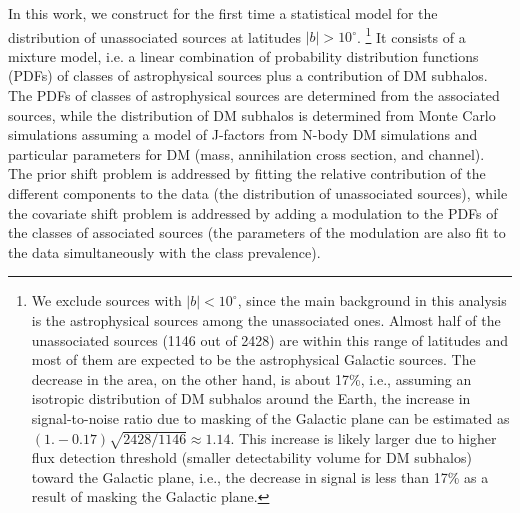 In this work, we construct for the first time a statistical model for the distribution of unassociated sources at latitudes $|b| > 10^\circ$.%
\footnote{We exclude sources with $|b| < 10^\circ$, since the main background in this analysis is the astrophysical sources among the unassociated ones. Almost half of the unassociated sources (1146 out of 2428) are within this range of latitudes and most of them are expected to be the astrophysical Galactic sources. The decrease in the area, on the other hand, is about 17\%, i.e., assuming an isotropic distribution of DM subhalos around the Earth, the increase in signal-to-noise ratio due to masking of the Galactic plane can be estimated as $ (1. - 0.17) \sqrt{2428/1146} \approx 1.14$.
This increase is likely larger due to higher flux detection threshold (smaller detectability volume for DM subhalos) toward the Galactic plane, i.e., the decrease in signal is less than 17\% as a result of masking the Galactic plane.
}
It consists of a mixture model, i.e. a linear combination of probability distribution functions (PDFs)
of classes of astrophysical sources plus a contribution of DM subhalos.
The PDFs of classes of astrophysical sources are determined from the associated sources, while the distribution of DM subhalos is determined from Monte Carlo simulations assuming a model of J-factors from N-body DM simulations and particular parameters for DM (mass, annihilation cross section, and channel).
The prior shift problem is addressed by fitting the relative contribution of the different components to the data (the distribution of unassociated sources), while the covariate shift problem is addressed by adding a modulation to the PDFs of the classes of associated sources (the parameters of the modulation are also fit to the data simultaneously with the class prevalence).

